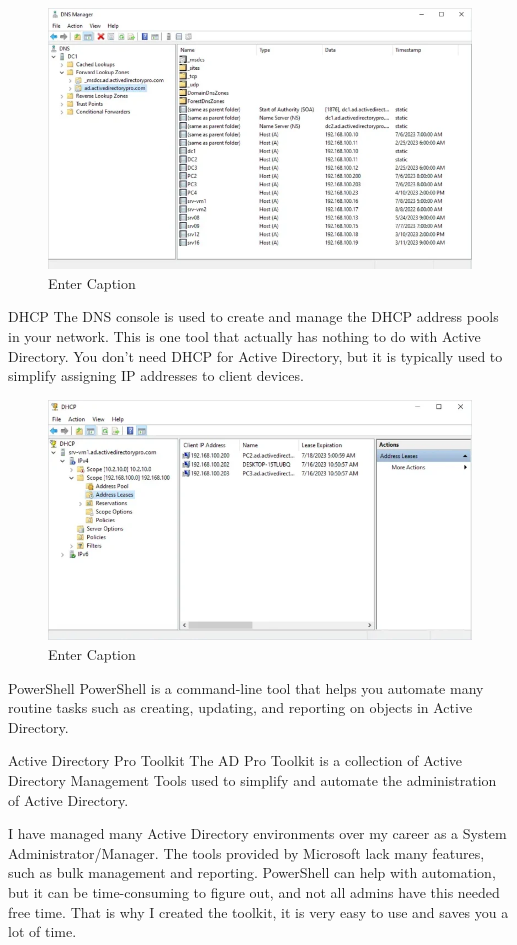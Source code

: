 \begin{figure}
    \centering
    \includegraphics[width=0.75\linewidth]{dns.png}
    \caption{Enter Caption}
    \label{fig:placeholder}
\end{figure}

DHCP
The DNS console is used to create and manage the DHCP address pools in your network. This is one tool that actually has nothing to do with Active Directory. You don’t need DHCP for Active Directory, but it is typically used to simplify assigning IP addresses to client devices.

\begin{figure}
    \centering
    \includegraphics[width=0.75\linewidth]{dhcp.png}
    \caption{Enter Caption}
    \label{fig:placeholder}
\end{figure}

PowerShell
PowerShell is a command-line tool that helps you automate many routine tasks such as creating, updating, and reporting on objects in Active Directory.

Active Directory Pro Toolkit
The AD Pro Toolkit is a collection of Active Directory Management Tools used to simplify and automate the administration of Active Directory.

I have managed many Active Directory environments over my career as a System Administrator/Manager. The tools provided by Microsoft lack many features, such as bulk management and reporting. PowerShell can help with automation, but it can be time-consuming to figure out, and not all admins have this needed free time. That is why I created the toolkit, it is very easy to use and saves you a lot of time.


